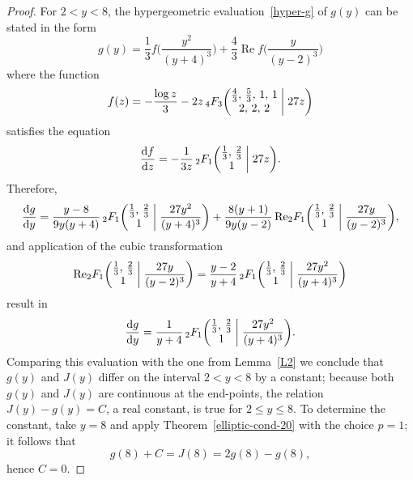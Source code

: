 \documentclass[12pt,reqno]{amsart}
\theoremstyle{remark}
\begin{document}
\begin{proof}
For $2<y<8$, the hypergeometric evaluation~\eqref{hyper-g} of $g(y)$ can be stated
in the form
$$
g(y)=\frac13f\biggl(\frac{y^2}{(y+4)^3}\biggr)+\frac43{\operatorname{Re}} f\biggl(\frac{y}{(y-2)^3}\biggr)
$$
where the function
\begin{equation}
f(z)=-\frac{\log z}3-2z\,{}_4F_3\biggl(\begin{matrix} \frac43, \, \frac53, \, 1, \, 1 \\
2, \, 2, \, 2 \end{matrix}\biggm| 27z \biggr)
\label{f-notation}
\end{equation}
satisfies the equation
$$
\frac{{{\mathrm d}} f}{{{\mathrm d}} z}=-\frac1{3z}\,{}_2F_1\biggl(\begin{matrix} \frac13, \, \frac23 \\
1 \end{matrix}\biggm| 27z \biggr).
$$
Therefore,
$$
\frac{{{\mathrm d}} g}{{{\mathrm d}} y}=\frac{y-8}{9y(y+4)}\,{}_2F_1\biggl(\begin{matrix} \frac13, \, \frac23 \\
1 \end{matrix}\biggm| \frac{27y^2}{(y+4)^3} \biggr)
+\frac{8(y+1)}{9y(y-2)}\,{\operatorname{Re}}{}_2F_1\biggl(\begin{matrix} \frac13, \, \frac23 \\
1 \end{matrix}\biggm| \frac{27y}{(y-2)^3} \biggr),
$$
and application of the cubic transformation
$$
{\operatorname{Re}}{}_2F_1\biggl(\begin{matrix} \frac13, \, \frac23 \\
1 \end{matrix}\biggm| \frac{27y}{(y-2)^3} \biggr)
=\frac{y-2}{y+4}\,{}_2F_1\biggl(\begin{matrix} \frac13, \, \frac23 \\
1 \end{matrix}\biggm| \frac{27y^2}{(y+4)^3} \biggr)
$$
result in
\begin{equation}
\frac{{{\mathrm d}} g}{{{\mathrm d}} y}=\frac1{y+4}\,{}_2F_1\biggl(\begin{matrix} \frac13, \, \frac23 \\
1 \end{matrix}\biggm| \frac{27y^2}{(y+4)^3} \biggr).
\label{dg/dy}
\end{equation}
Comparing this evaluation with the one from Lemma~\ref{L2} we
conclude that $g(y)$ and $ J(y)$ differ on the interval $2<y<8$ by
a constant; because both $g(y)$ and $ J(y)$ are continuous at the
end-points, the relation $ J(y)-g(y)=C$, a real constant, is true
for $2\le y\le8$. To determine the constant, take $y=8$ and apply
Theorem~\ref{elliptic-cond-20} with the choice $p=1$; it follows
that
$$
g(8)+C=J(8)=2g(8)-g(8),
$$
hence $C=0$.
\end{proof}
\end{document}
